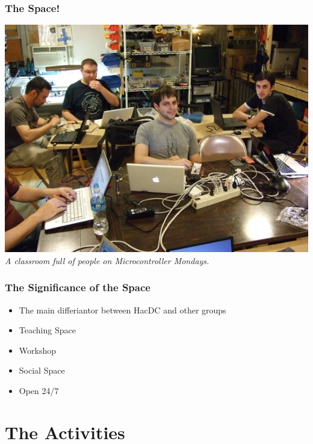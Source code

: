 \documentclass[notes]{beamer}
\begin{document}
\begin{frame}[fragile]
  \frametitle{The Space!}
  \begin{center}
    \includegraphics[width=.8\textwidth,height=.8\textheight]{dscf2730_small.jpg} \\
    {\em A classroom full of people on Microcontroller Mondays.}
  \end{center}
\end{frame}

\begin{frame}
  \frametitle{The Significance of the Space}
  \begin{itemize}
  \item The main differiantor between HacDC and other groups
  \item Teaching Space
  \item Workshop
  \item Social Space
  \item Open 24/7
  \end{itemize}
\end{frame}

\section{The Activities}
\end{document}

